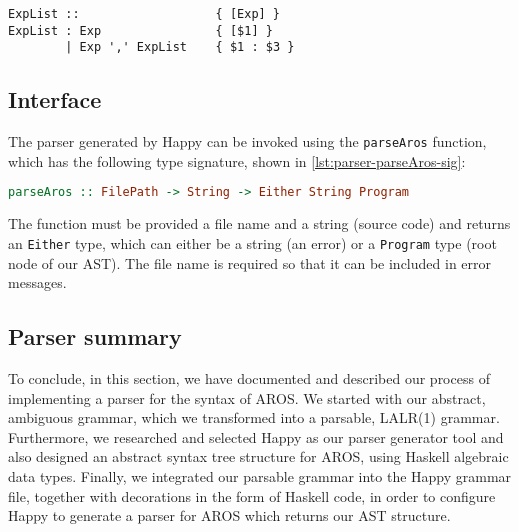 \begin{lstlisting}[language=happy, float=htb,
caption={Happy grammar specification for non-terminal \lstinline{ExpList}},
label=lst:parser-explist-example]
ExpList ::                   { [Exp] }
ExpList : Exp                { [$1] }
        | Exp ',' ExpList    { $1 : $3 }
\end{lstlisting}

\subsection{Interface}
The parser generated by Happy can be invoked using the \lstinline{parseAros} function, which has the following type signature, shown in \cref{lst:parser-parseAros-sig}:
\begin{lstlisting}[language=haskell, float=htb, numbers=none,
caption={Type signature of \lstinline{parseAros}},
label=lst:parser-parseAros-sig]
parseAros :: FilePath -> String -> Either String Program
\end{lstlisting}
The function must be provided a file name and a string (source code) and returns an \lstinline{Either} type, which can either be a string (an error) or a \lstinline{Program} type (root node of our AST). The file name is required so that it can be included in error messages. 

\subsection{Parser summary}
To conclude, in this section, we have documented and described our process of implementing a parser for the syntax of AROS. We started with our abstract, ambiguous grammar, which we transformed into a parsable, LALR(1) grammar. Furthermore, we researched and selected Happy as our parser generator tool and also designed an abstract syntax tree structure for AROS, using Haskell algebraic data types. Finally, we integrated our parsable grammar into the Happy grammar file, together with decorations in the form of Haskell code, in order to configure Happy to generate a parser for AROS which returns our AST structure.
\pagebreak
